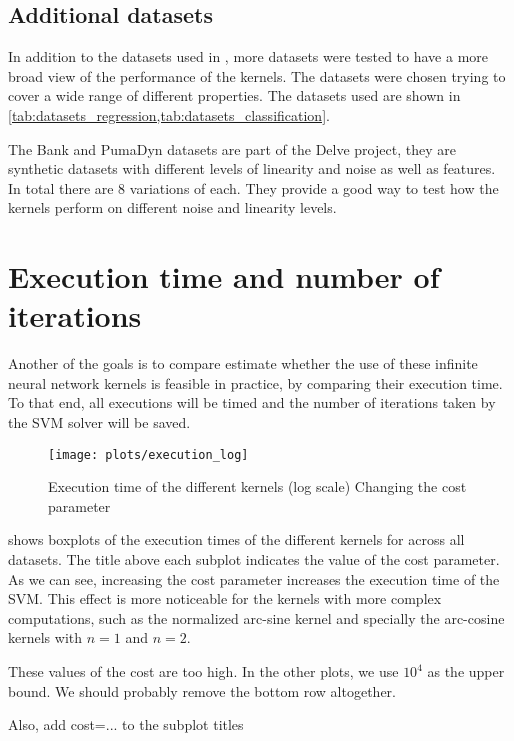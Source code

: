 \subsection{Additional datasets}%

In addition to the datasets used in \cite{frenayParameterinsensitiveKernelExtreme2011},
more datasets were tested to have a more broad view of the performance of the
kernels. The datasets were chosen trying to cover a wide range of different
properties. The datasets used are shown in \cref{tab:datasets_regression,tab:datasets_classification}.


The Bank and PumaDyn datasets are part of the Delve project, they are synthetic
datasets with different levels of linearity and noise as well as features. In total
there are 8 variations of each. They provide a good way to test how the kernels
perform on different noise and linearity levels.

\section{Execution time and number of iterations}%
\label{sec:execution-time-and-number-of-iterations}

Another of the goals is to compare estimate whether the use of these infinite
neural network kernels is feasible in practice, by comparing their execution
time. To that end, all executions will be timed and the number of iterations
taken by the SVM solver will be saved.

\begin{figure}[H]
    \texttt{[image: plots/execution\_log]}
    \caption{Execution time of the different kernels (log scale) Changing the cost
        parameter}%
    \label{fig:execution-log}
\end{figure}

 shows boxplots of the execution times of the different
kernels for across all datasets. The title above each subplot indicates the
value of the cost parameter. As we can see, increasing the cost parameter
increases the execution time of the SVM. This effect is more noticeable for the
kernels with more complex computations, such as the normalized arc-sine kernel
and specially the arc-cosine kernels with $n=1$ and $n=2$.

\begin{cnote}
    These values of the cost are too high.
    In the other plots, we use $10^4$ as the upper bound.
    We should probably remove the bottom row altogether.

    Also, add cost=... to the subplot titles
\end{cnote}

